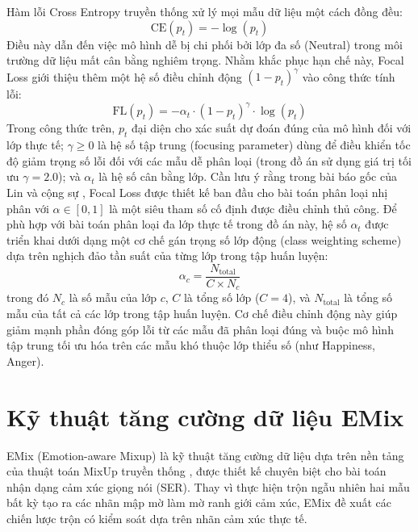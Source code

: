 Hàm lỗi Cross Entropy truyền thống xử lý mọi mẫu dữ liệu một cách đồng đều:
\begin{equation}
    \text{CE}(p_t) = -\log(p_t)
    \label{eq:ce}
\end{equation}
Điều này dẫn đến việc mô hình dễ bị chi phối bởi lớp đa số (Neutral) trong môi trường dữ liệu mất cân bằng nghiêm trọng. Nhằm khắc phục hạn chế này, Focal Loss \cite{lin2017} giới thiệu thêm một hệ số điều chỉnh động $(1 - p_t)^\gamma$ vào công thức tính lỗi:
\begin{equation}
    \text{FL}(p_t) = -\alpha_t \cdot (1 - p_t)^\gamma \cdot \log(p_t)
    \label{eq:focal}
\end{equation}
Trong công thức trên, $p_t$ đại diện cho xác suất dự đoán đúng của mô hình đối với lớp thực tế; $\gamma \geq 0$ là hệ số tập trung (focusing parameter) dùng để điều khiển tốc độ giảm trọng số lỗi đối với các mẫu dễ phân loại (trong đồ án sử dụng giá trị tối ưu $\gamma = 2.0$); và $\alpha_t$ là hệ số cân bằng lớp. Cần lưu ý rằng trong bài báo gốc của Lin và cộng sự \cite{lin2017}, Focal Loss được thiết kế ban đầu cho bài toán phân loại nhị phân với $\alpha \in [0, 1]$ là một siêu tham số cố định được điều chỉnh thủ công. Để phù hợp với bài toán phân loại đa lớp thực tế trong đồ án này, hệ số $\alpha_t$ được triển khai dưới dạng một cơ chế gán trọng số lớp động (class weighting scheme) dựa trên nghịch đảo tần suất của từng lớp trong tập huấn luyện:
\begin{equation}
    \alpha_c = \frac{N_{\text{total}}}{C \times N_c}
\end{equation}
trong đó $N_c$ là số mẫu của lớp $c$, $C$ là tổng số lớp ($C = 4$), và $N_{\text{total}}$ là tổng số mẫu của tất cả các lớp trong tập huấn luyện. Cơ chế điều chỉnh động này giúp giảm mạnh phần đóng góp lỗi từ các mẫu đã phân loại đúng và buộc mô hình tập trung tối ưu hóa trên các mẫu khó thuộc lớp thiểu số (như Happiness, Anger).


\section{Kỹ thuật tăng cường dữ liệu EMix}
\label{sec:emix}

EMix (Emotion-aware Mixup) \cite{dang2023emix} là kỹ thuật tăng cường dữ liệu dựa trên nền tảng của thuật toán MixUp truyền thống \cite{zhang2018}, được thiết kế chuyên biệt cho bài toán nhận dạng cảm xúc giọng nói (SER). Thay vì thực hiện trộn ngẫu nhiên hai mẫu bất kỳ tạo ra các nhãn mập mờ làm mờ ranh giới cảm xúc, EMix đề xuất các chiến lược trộn có kiểm soát dựa trên nhãn cảm xúc thực tế.

